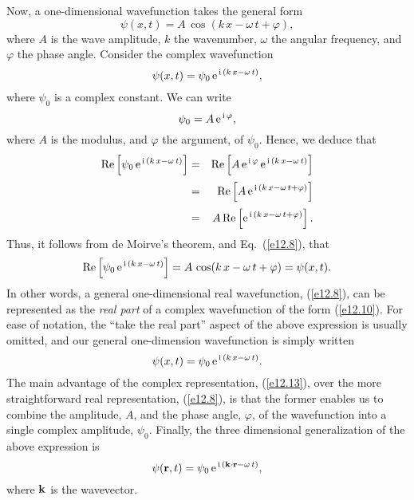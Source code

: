 Now, a  one-dimensional wavefunction takes the general form
\begin{equation}\label{e12.8}
\psi(x,t) = A\,\cos(k\,x-\omega\,t+\varphi),
\end{equation}
where $A$ is the wave amplitude, $k$ the wavenumber,  $\omega$ the angular
frequency, and $\varphi$ the phase angle.  Consider the complex wavefunction
\begin{equation}\label{e12.10}
\psi(x,t) = \psi_0\,{\rm e}^{\,{\rm i}\,(k\,x-\omega\,t)},
\end{equation}
where $\psi_0$ is a complex constant. We can write
\begin{equation}
\psi_0 = A\,{\rm e}^{\,{\rm i}\,\varphi},
\end{equation}
where $A$ is the modulus, and $\varphi$ the argument, of $\psi_0$.
Hence, we deduce that
\begin{eqnarray}
{\rm Re}\left[\psi_0\,{\rm e}^{\,{\rm i}\,(k\,x-\omega\,t)}\right] &=& {\rm Re}\left[A\,{\rm e}^{\,{\rm i}\,\varphi}\,{\rm e}^{\,{\rm i}\,(k\,x-\omega\,t)}\right]\nonumber\\[0.5ex]
&=&{\rm Re}\left[A\,{\rm e}^{\,{\rm i}\,(k\,x-\omega\,t+\varphi)}\right]\nonumber\\[0.5ex]&=&A\,{\rm Re}\left[{\rm e}^{\,{\rm i}\,(k\,x-\omega\,t+\varphi)}\right].
\end{eqnarray}
Thus, it follows from de Moirve's theorem, and Eq.~(\ref{e12.8}), that
\begin{equation}
{\rm Re}\left[\psi_0\,{\rm e}^{\,{\rm i}\,(k\,x-\omega\,t)}\right] =A\,\cos(k\,x-\omega\,t+\varphi)=\psi(x,t).
\end{equation}
In other words, a  general one-dimensional real wavefunction, (\ref{e12.8}), can be
represented as the {\em real part}\/ of a complex wavefunction of the form (\ref{e12.10}).
For ease
of notation, the ``take the real part''  aspect of the above expression is usually omitted, and our general one-dimension wavefunction
is simply written
\begin{equation}\label{e12.13}
\psi(x,t) = \psi_0\,{\rm e}^{\,{\rm i}\,(k\,x-\omega\,t)}.
\end{equation}
 The
main advantage of the complex representation, (\ref{e12.13}), over the more straightforward
real representation, (\ref{e12.8}), is that the former enables us to combine the amplitude, $A$, and the
phase angle, $\varphi$, of the wavefunction into a single complex amplitude, $\psi_0$. 
Finally, the three dimensional generalization of the  above expression is
\begin{equation}
\psi({\bf r},t) = \psi_0\,{\rm e}^{\,{\rm i}\,({\bf k}\cdot{\bf r}-\omega\,t)},
\end{equation}
where ${\bf k}$ is the wavevector.  

